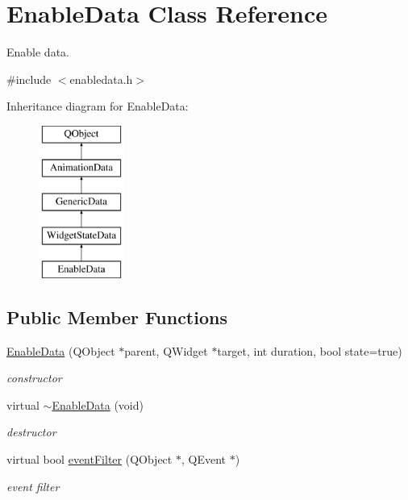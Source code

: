 \hypertarget{class_enable_data}{}\section{Enable\+Data Class Reference}
\label{class_enable_data}


Enable data.  




{\ttfamily \#include $<$enabledata.\+h$>$}

Inheritance diagram for Enable\+Data\+:\begin{figure}[H]
\begin{center}
\leavevmode
\includegraphics[height=5.000000cm]{class_enable_data}
\end{center}
\end{figure}
\subsection*{Public Member Functions}
\begin{DoxyCompactItemize}
\item 
\mbox{\label{class_enable_data_a4d3b8e0a5bf6199e4d5cd39e16e018aa}} 
\hyperlink{class_enable_data_a4d3b8e0a5bf6199e4d5cd39e16e018aa}{Enable\+Data} (Q\+Object $\ast$parent, Q\+Widget $\ast$target, int duration, bool state=true)
\begin{DoxyCompactList}\small\item\em constructor \end{DoxyCompactList}\item 
\mbox{\label{class_enable_data_a1a5f38e3a2bc294d02a732c38b3dd57e}} 
virtual \hyperlink{class_enable_data_a1a5f38e3a2bc294d02a732c38b3dd57e}{$\sim$\+Enable\+Data} (void)
\begin{DoxyCompactList}\small\item\em destructor \end{DoxyCompactList}\item 
\mbox{\label{class_enable_data_a50734d4b08c8f1a3deb3e6219bf4685d}} 
virtual bool \hyperlink{class_enable_data_a50734d4b08c8f1a3deb3e6219bf4685d}{event\+Filter} (Q\+Object $\ast$, Q\+Event $\ast$)
\begin{DoxyCompactList}\small\item\em event filter \end{DoxyCompactList}\end{DoxyCompactItemize}
